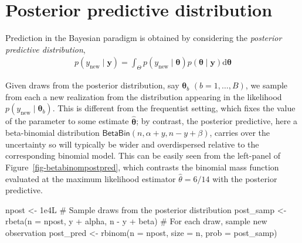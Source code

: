 \documentclass[
  11pt,
  letterpaper,
]{scrbook}
\newenvironment{Shaded}{\begin{snugshade}}{\end{snugshade}}
\newcommand{\AttributeTok}[1]{\textcolor[rgb]{0.40,0.45,0.13}{#1}}
\newcommand{\CommentTok}[1]{\textcolor[rgb]{0.37,0.37,0.37}{#1}}
\newcommand{\FloatTok}[1]{\textcolor[rgb]{0.68,0.00,0.00}{#1}}
\newcommand{\FunctionTok}[1]{\textcolor[rgb]{0.28,0.35,0.67}{#1}}
\newcommand{\NormalTok}[1]{\textcolor[rgb]{0.00,0.23,0.31}{#1}}
\newcommand{\OtherTok}[1]{\textcolor[rgb]{0.00,0.23,0.31}{#1}}
\newcommand{\SpecialCharTok}[1]{\textcolor[rgb]{0.37,0.37,0.37}{#1}}
\theoremstyle{definition}
\theoremstyle{plain}
\theoremstyle{plain}
\theoremstyle{definition}
\theoremstyle{definition}
\theoremstyle{remark}
\begin{document}
\section{Posterior predictive
distribution}\label{posterior-predictive-distribution}

Prediction in the Bayesian paradigm is obtained by considering the
\emph{posterior predictive distribution}, \begin{align*}
p(y_{\text{new}} \mid \boldsymbol{y}) =
\int_{\Theta} p(y_{\text{new}}  \mid \boldsymbol{\theta}) p(\boldsymbol{\theta} \mid  \boldsymbol{y}) \mathrm{d} \boldsymbol{\theta}
\end{align*}

Given draws from the posterior distribution, say
\(\boldsymbol{\theta}_b\) \((b=1, \ldots, B)\), we sample from each a
new realization from the distribution appearing in the likelihood
\(p(y_{\text{new}}  \mid \boldsymbol{\theta}_b)\). This is different
from the frequentist setting, which fixes the value of the parameter to
some estimate \(\widehat{\boldsymbol{\theta}}\); by contrast, the
posterior predictive, here a beta-binomial distribution
\(\mathsf{BetaBin}(n, \alpha + y, n - y + \beta)\), carries over the
uncertainty so will typically be wider and overdispersed relative to the
corresponding binomial model. This can be easily seen from the
left-panel of Figure~\ref{fig-betabinompostpred}, which contrasts the
binomial mass function evaluated at the maximum likelihood estimator
\(\widehat{\theta}=6/14\) with the posterior predictive.

\begin{Shaded}
\begin{Highlighting}[]
\NormalTok{npost }\OtherTok{\textless{}{-}} \FloatTok{1e4}\NormalTok{L}
\CommentTok{\# Sample draws from the posterior distribution}
\NormalTok{post\_samp }\OtherTok{\textless{}{-}} \FunctionTok{rbeta}\NormalTok{(}\AttributeTok{n =}\NormalTok{ npost, y }\SpecialCharTok{+}\NormalTok{ alpha, n }\SpecialCharTok{{-}}\NormalTok{ y }\SpecialCharTok{+}\NormalTok{ beta)}
\CommentTok{\# For each draw, sample new observation}
\NormalTok{post\_pred }\OtherTok{\textless{}{-}} \FunctionTok{rbinom}\NormalTok{(}\AttributeTok{n =}\NormalTok{ npost, }\AttributeTok{size =}\NormalTok{ n, }\AttributeTok{prob =}\NormalTok{ post\_samp)}
\end{Highlighting}
\end{Shaded}
\end{document}
